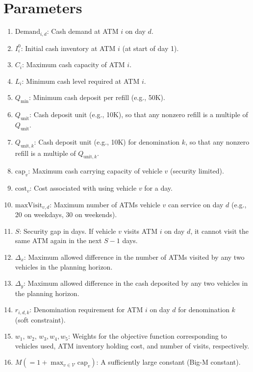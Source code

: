 \documentclass[11pt]{article}
\begin{document}
\section*{Parameters}
\begin{enumerate}[leftmargin=1.5cm]
    \item \(\displaystyle \text{Demand}_{i,d}\): Cash demand at ATM \(i\) on day \(d\).
    \item \(\displaystyle I_i^0\): Initial cash inventory at ATM \(i\) (at start of day 1).
    \item \(\displaystyle C_i\): Maximum cash capacity of ATM \(i\).
    \item \(\displaystyle L_i\): Minimum cash level required at ATM \(i\).
    \item \(\displaystyle Q_{\min}\): Minimum cash deposit per refill (e.g., 50K).
    \item \(\displaystyle Q_{\text{unit}}\): Cash deposit unit (e.g., 10K), so that any nonzero refill is a multiple of \(Q_{\text{unit}}\).
    \item \(\displaystyle Q_{\text{unit},k}\): Cash deposit unit (e.g., 10K) for denomination \(k\), so that any nonzero refill is a multiple of \(Q_{\text{unit},k}\).
    \item \(\displaystyle \text{cap}_v\): Maximum cash carrying capacity of vehicle \(v\) (security limited).
    \item \(\displaystyle \text{cost}_v\): Cost associated with using vehicle \(v\) for a day.
    \item \(\displaystyle \text{maxVisit}_{v,d}\): Maximum number of ATMs vehicle \(v\) can service on day \(d\) (e.g., 20 on weekdays, 30 on weekends).
    \item \(\displaystyle S\): Security gap in days. If vehicle \(v\) visits ATM \(i\) on day \(d\), it cannot visit the same ATM again in the next \(S-1\) days.
    \item \(\displaystyle \Delta_x\): Maximum allowed difference in the number of ATMs visited by any two vehicles in the planning horizon.
    \item \(\displaystyle \Delta_y\): Maximum allowed difference in the cash deposited by any two vehicles in the planning horizon.
    
    \item \(\displaystyle r_{i,d,k}\): Denomination requirement for ATM \(i\) on day \(d\) for denomination \(k\) (soft constraint).
    \item \(\displaystyle w_1,\, w_2,\, w_3, w_4, w_5\): Weights for the objective function corresponding to vehicles used, ATM inventory holding cost, and number of visits, respectively.
    \item \(\displaystyle M \left(= 1 + \max_{v \in \mathcal{V}} \text{cap}_v\right)\): A sufficiently large constant (Big-M constant).
\end{enumerate}
\end{document}
